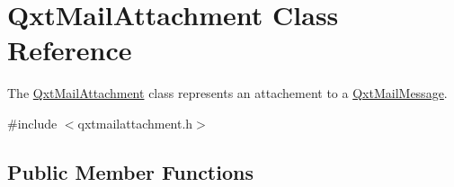 \hypertarget{class_qxt_mail_attachment}{\section{Qxt\-Mail\-Attachment Class Reference}
\label{class_qxt_mail_attachment}
}


The \hyperlink{class_qxt_mail_attachment}{Qxt\-Mail\-Attachment} class represents an attachement to a \hyperlink{class_qxt_mail_message}{Qxt\-Mail\-Message}.  




{\ttfamily \#include $<$qxtmailattachment.\-h$>$}

\subsection*{Public Member Functions}
